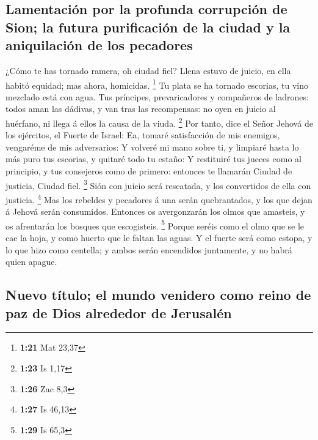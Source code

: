 \hypertarget{lamentaciuxf3n-por-la-profunda-corrupciuxf3n-de-sion-la-futura-purificaciuxf3n-de-la-ciudad-y-la-aniquilaciuxf3n-de-los-pecadores}{%
\subsection{Lamentación por la profunda corrupción de Sion; la futura
purificación de la ciudad y la aniquilación de los
pecadores}\label{lamentaciuxf3n-por-la-profunda-corrupciuxf3n-de-sion-la-futura-purificaciuxf3n-de-la-ciudad-y-la-aniquilaciuxf3n-de-los-pecadores}}

 ¿Cómo te has tornado ramera, oh ciudad fiel? Llena
estuvo de juicio, en ella habitó equidad; mas ahora, homicidas.
\footnote{\textbf{1:21} Mat 23,37}  Tu plata se ha
tornado escorias, tu vino mezclado está con agua.  Tus
príncipes, prevaricadores y compañeros de ladrones: todos aman las
dádivas, y van tras las recompensas: no oyen en juicio al huérfano, ni
llega á ellos la causa de la viuda. \footnote{\textbf{1:23} Is 1,17}
 Por tanto, dice el Señor Jehová de los ejércitos, el
Fuerte de Israel: Ea, tomaré satisfacción de mis enemigos, vengaréme de
mis adversarios:  Y volveré mi mano sobre ti, y limpiaré
hasta lo más puro tus escorias, y quitaré todo tu estaño:
 Y restituiré tus jueces como al principio, y tus
consejeros como de primero: entonces te llamarán Ciudad de justicia,
Ciudad fiel. \footnote{\textbf{1:26} Zac 8,3}  Sión con
juicio será rescatada, y los convertidos de ella con justicia.
\footnote{\textbf{1:27} Is 46,13}  Mas los rebeldes y
pecadores á una serán quebrantados, y los que dejan á Jehová serán
consumidos.  Entonces os avergonzarán los olmos que
amasteis, y os afrentarán los bosques que escogisteis. \footnote{\textbf{1:29}
  Is 65,3}  Porque seréis como el olmo que se le cae la
hoja, y como huerto que le faltan las aguas.  Y el fuerte
será como estopa, y lo que hizo como centella; y ambos serán encendidos
juntamente, y no habrá quien apague.

\hypertarget{nuevo-tuxedtulo-el-mundo-venidero-como-reino-de-paz-de-dios-alrededor-de-jerusaluxe9n}{%
\subsection{Nuevo título; el mundo venidero como reino de paz de Dios
alrededor de
Jerusalén}\label{nuevo-tuxedtulo-el-mundo-venidero-como-reino-de-paz-de-dios-alrededor-de-jerusaluxe9n}}


